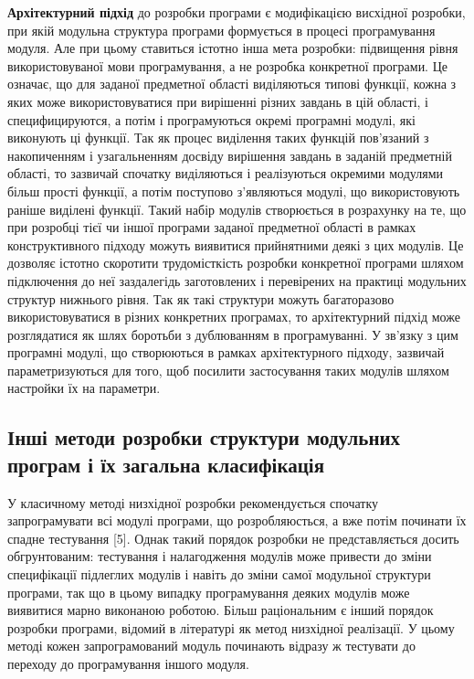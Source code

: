 \documentclass[a4paper,14pt, titlepage]{article}
\begin{document}
\textbf{Архітектурний підхід} до розробки програми є модифікацією
висхідної розробки, при якій модульна структура програми формується в
процесі програмування модуля. Але при цьому ставиться істотно інша мета
розробки: підвищення рівня використовуваної мови програмування, а не
розробка конкретної програми. Це означає, що для заданої предметної
області виділяються типові функції, кожна з яких може використовуватися
при вирішенні різних завдань в цій області, і специфицируются, а потім і
програмуються окремі програмні модулі, які виконують ці функції. Так як
процес виділення таких функцій пов'язаний з накопиченням і узагальненням
досвіду вирішення завдань в заданій предметній області, то зазвичай
спочатку виділяються і реалізуються окремими модулями більш прості
функції, а потім поступово з'являються модулі, що використовують раніше
виділені функції. Такий набір модулів створюється в розрахунку на те, що
при розробці тієї чи іншої програми заданої предметної області в рамках
конструктивного підходу можуть виявитися прийнятними деякі з цих
модулів. Це дозволяє істотно скоротити трудомісткість розробки
конкретної програми шляхом підключення до неї заздалегідь заготовлених і
перевірених на практиці модульних структур нижнього рівня. Так як такі
структури можуть багаторазово використовуватися в різних конкретних
програмах, то архітектурний підхід може розглядатися як шлях боротьби з
дублюванням в програмуванні. У зв'язку з цим програмні модулі, що
створюються в рамках архітектурного підходу, зазвичай параметризуються
для того, щоб посилити застосування таких модулів шляхом настройки їх на
параметри.

\subsection{Інші методи розробки структури модульних програм і їх загальна класифікація}

У класичному методі низхідної розробки рекомендується спочатку  запрограмувати всі
модулі програми, що розробляюсться, а вже потім починати
їх спадне тестування [5]. Однак такий порядок розробки не
представляється досить обгрунтованим: тестування і налагодження модулів
може привести до зміни специфікації підлеглих модулів і навіть до зміни
самої модульної структури програми, так що в цьому випадку програмування
деяких модулів може виявитися марно виконаною роботою. Більш
раціональним є інший порядок розробки програми, відомий в літературі як
метод низхідної реалізації. У цьому методі кожен запрограмований модуль
починають відразу ж тестувати до переходу до програмування іншого
модуля.
\end{document}
